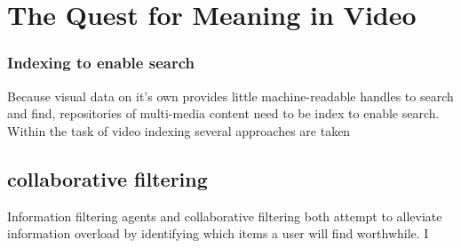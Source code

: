 \chapter{The Quest for Meaning in Video}
\label{ch:quest}



\subsection{Indexing to enable search}
Because visual data on it's own provides little machine-readable handles to search and find, repositories of multi-media content need to be index to enable search. Within the task of video indexing several approaches are taken 


\section{collaborative filtering}
Information filtering agents and collaborative filtering both
attempt to alleviate information overload by identifying
which items a user will find worthwhile.  I